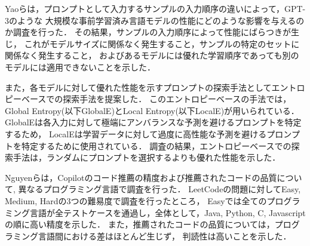   Yaoら\cite{Yao2022ACL}は，プロンプトとして入力するサンプルの入力順序の違いによって，GPT-3のような
  大規模な事前学習済み言語モデルの性能にどのような影響を与えるのか調査を行った．
  その結果，サンプルの入力順序によって性能にばらつきが生じ，
  これがモデルサイズに関係なく発生すること，サンプルの特定のセットに関係なく発生すること，
  およびあるモデルには優れた学習順序であっても別のモデルには適用できないことを示した．
  
  \noindent また，各モデルに対して優れた性能を示すプロンプトの探索手法としてエントロピーベースでの探索手法を提案した．
  このエントロピーベースの手法では，Global Entropy(以下GlobalE)とLocal Entropy(以下LocalE)が用いられている．
  GlobalEは各入力に対して極端にアンバランスな予測を避けるプロンプトを特定するため，
  LocalEは学習データに対して過度に高性能な予測を避けるプロンプトを特定するために使用されている．
  調査の結果，エントロピーベースでの探索手法は，ランダムにプロンプトを選択するよりも優れた性能を示した．

  Nguyen\cite{Nguyen2022MSR}らは，Copilotのコード推薦の精度および推薦されたコードの品質について,
  異なるプログラミング言語で調査を行った．
  LeetCodeの問題に対してEasy, Medium, Hardの3つの難易度で調査を行ったところ，
  Easyでは全てのプログラミング言語が全テストケースを通過し，全体として，Java, Python, C, Javascriptの順に高い精度を示した．
  また，推薦されたコードの品質については，プログラミング言語間における差はほとんど生じず，
  判読性は高いことを示した．


  